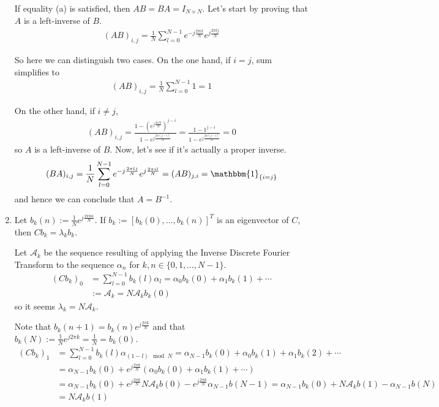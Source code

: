 \documentclass{article}
\begin{document}
\begin{enumerate}
    If equality (a) is satisfied, then $A B = BA = I_{N\times N}$. Let's start by proving that $A$ is a left-inverse of $B$.
    \begin{align}
        (A B)_{i,j} = \frac{1}{N} \sum_{l=0}^{N-1} e ^{-j\frac{2\pi i l}{N}} e ^{j\frac{2\pi l j}{N}}
    \end{align}
    
    So here we can distinguish two cases. On the one hand, if $i=j$, sum simplifies to
    \begin{align}
        (A B)_{i,j} = \frac{1}{N} \sum_{l=0}^{N-1} 1= 1
    \end{align}
    
    On the other hand, if $i\neq j$,
    \begin{align}
        (A B)_{i,j} = \frac{1-(e^{j\frac{2\pi N}{N}})^{j-i}}{1-e^{j\frac{2\pi (j-i)}{N}}}=\frac{1-1^{j-i}}{1-e^{j\frac{2\pi (j-i)}{N}}}=0
    \end{align}
    so $A$ is a left-inverse of $B$. Now, let's see if it's actually a proper inverse.
    \begin{align}
        (B A)_{i,j} = \frac{1}{N} \sum_{l=0}^{N-1} e ^{-j\frac{2\pi l j}{N}} e ^{j\frac{2\pi i l}{N}} = (AB)_{j, i} = \mathbbm{1}_{\{i=j\}}
    \end{align}
    and hence we can conclude that $A = B^{-1}$.
    
    \item Let $b_k(n) := \frac{1}{N}e^{j\frac{2\pi kn}{N}}$. If $b_k := [b_k(0),\dots, b_k(n)]^T$ is an eigenvector of $C$, then $C b_k = \lambda_k b_k$.
    
    Let $\mathcal{A}_k$ be the sequence resulting of applying the Inverse Discrete Fourier Transform to the sequence $\alpha_n$ for $k,n\in\{0,1,\dots,N-1\}$.
    \begin{align}
        (Cb_k)_0 &= \sum_{l=0}^{N-1} b_k(l) \alpha_{l} = \alpha_0 b_k(0) + \alpha_1 b_k(1) + \cdots \\
        &:=\mathcal{A}_k = N \mathcal{A}_k b_k(0)
    \end{align}
    so it seems $\lambda_k = N \mathcal{A}_k$.
    
    Note that $b_k(n+1) = b_k(n)e^{j\frac{2\pi k}{N}}$ and that $b_k(N):= \frac{1}{N} e^{j2\pi k}=\frac{1}{N} = b_k(0)$.
    \begin{align}
        (Cb_k)_1 &= \sum_{l=0}^{N-1} b_k(l) \alpha_{(1-l)\mod N} = \alpha_{N-1} b_k(0) + \alpha_0 b_k(1) + \alpha_1 b_k(2) +\cdots  \\
        &=\alpha_{N-1} b_k(0) + e^{j\frac{2\pi k}{N}} (\alpha_0 b_k(0) + \alpha_1 b_k(1) + \cdots) \\
        &= \alpha_{N-1} b_k(0) + e^{j\frac{2\pi k}{N}} N\mathcal{A}_k b(0)- e^{j\frac{2\pi k}{N}}\alpha_{N-1} b(N-1) = \alpha_{N-1} b_k(0) + N\mathcal{A}_k b(1) - \alpha_{N-1} b(N) \\
        &= N\mathcal{A}_k b(1)
    \end{align}
    

\end{enumerate}
\end{document}
